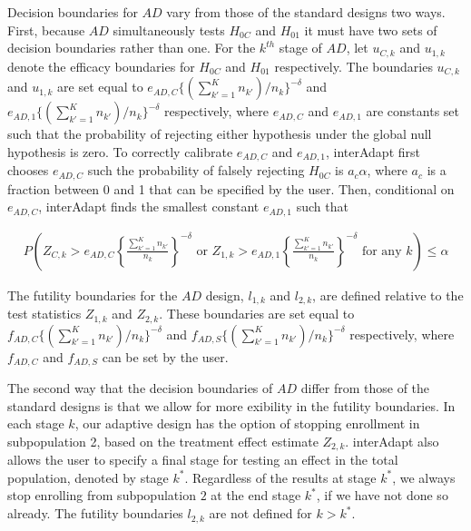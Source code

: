 \documentclass{article}
\newcommand{\interAdapt}{\textsf{interAdapt }}
\begin{document}
Decision boundaries for $AD$ vary from those of the standard designs two ways. First, because $AD$ simultaneously tests $H_{0C}$ and $H_{01}$ it must have two sets of decision boundaries rather than one. For the $k^{th}$ stage of $AD$, let $u_{C,k}$ and $u_{1,k}$ denote the efficacy boundaries for $H_{0C}$ and $H_{01}$ respectively. The boundaries $u_{C,k}$ and $u_{1,k}$ are set equal to $e_{AD,C}\{(\sum_{k'=1}^{K} n_{k'})/n_k\}^{-δ}$ and $e_{AD,1}\{(\sum_{k'=1}^{K} n_{k'})/n_k\}^{-δ}$ respectively, where $e_{AD,C}$  and $e_{AD,1}$ are constants set such that the probability of rejecting either hypothesis under the global null hypothesis is zero. 
To correctly calibrate $e_{AD,C}$  and $e_{AD,1}$, \interAdapt first chooses $e_{AD,C}$ such the probability of falsely rejecting $H_{0C}$ is $a_c α$, where $a_c$ is a fraction between 0 and 1 that can be specified by the user. Then, conditional on $e_{AD,C}$, \interAdapt finds the smallest constant $e_{AD,1}$ such that %

\begin{equation*}\begin{split}
P\left(
Z_{C,k}>e_{AD,C} \left\{\frac{\sum_{k'=1}^{K} n_{k'}}{n_k}\right\}^{-δ} \text{  or  } Z_{1,k}> e_{AD,1}\left\{\frac{\sum_{k'=1}^{K} n_{k'}}{n_k}\right\}^{-δ}\text{  for any $k$}
\right) ≤ α 
\end{split}\end{equation*}

The futility boundaries for the $AD$ design, $l_{1,k}$ and $l_{2,k}$, are defined relative to the test statistics $Z_{1,k}$ and $Z_{2,k}$. These boundaries are set equal to $f_{AD,C}\{(\sum_{k'=1}^{K} n_{k'})/n_k\}^{-δ}$ and $f_{AD,S}\{(\sum_{k'=1}^{K} n_{k'})/n_k\}^{-δ}$ respectively, where $f_{AD,C}$ and $f_{AD,S}$ can be set by the user.

The second way that the decision boundaries of $AD$ differ from those of the standard designs is that we allow for more exibility in the futility boundaries. In each stage $k$, our adaptive design has the option of stopping enrollment in subpopulation 2, based on the treatment effect estimate $Z_{2,k}$. \interAdapt also allows the user to specify a final stage for testing an effect in the total population, denoted by stage $k^*$. Regardless of the results at stage $k^*$, we always stop enrolling from subpopulation $2$ at the end stage $k^*$, if we have not done so already. The futility boundaries $l_{2,k}$ are not defined for $k>k^*$.
\end{document}

